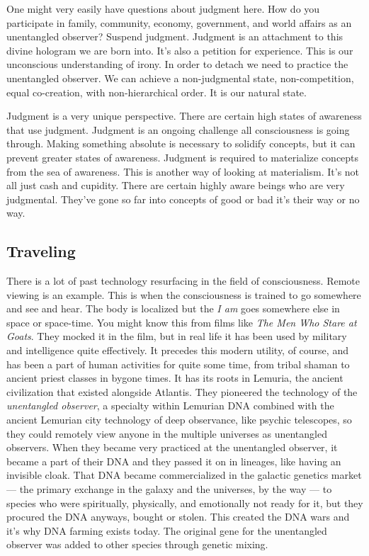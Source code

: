 One might very easily have questions about judgment here. How do you
participate in family, community, economy, government, and world affairs
as an unentangled observer? Suspend judgment. Judgment is an attachment
to this divine hologram we are born into. It's also a petition for
experience. This is our unconscious understanding of irony. In order to
detach we need to practice the unentangled observer. We can achieve a
non-judgmental state, non-competition, equal co-creation, with
non-hierarchical order. It is our natural state.

Judgment is a very unique perspective. There are certain high states of
awareness that use judgment. Judgment is an ongoing challenge all
consciousness is going through. Making something absolute is necessary
to solidify concepts, but it can prevent greater states of awareness.
Judgment is required to materialize concepts from the sea of awareness.
This is another way of looking at materialism. It's not all just cash
and cupidity. There are certain highly aware beings who are very
judgmental. They've gone so far into concepts of good or bad it's their
way or no way.

\subsection{Traveling}\label{traveling}

There is a lot of past technology resurfacing in the field of
consciousness. Remote viewing is an example. This is when the
consciousness is trained to go somewhere and see and hear. The body is
localized but the \emph{I am} goes somewhere else in space or
space-time. You might know this from films like \emph{The Men Who Stare
at Goats}. They mocked it in the film, but in real life it has been used
by military and intelligence quite effectively. It precedes this modern
utility, of course, and has been a part of human activities for quite
some time, from tribal shaman to ancient priest classes in bygone times.
It has its roots in Lemuria, the ancient civilization that existed
alongside Atlantis. They pioneered the technology of the
\emph{unentangled observer}, a specialty within Lemurian DNA combined
with the ancient Lemurian city technology of deep observance, like
psychic telescopes, so they could remotely view anyone in the multiple
universes as unentangled observers. When they became very practiced at
the unentangled observer, it became a part of their DNA and they passed
it on in lineages, like having an invisible cloak. That DNA became
commercialized in the galactic genetics market --- the primary exchange
in the galaxy and the universes, by the way --- to species who were
spiritually, physically, and emotionally not ready for it, but they
procured the DNA anyways, bought or stolen. This created the DNA wars
and it's why DNA farming exists today. The original gene for the
unentangled observer was added to other species through genetic mixing.

